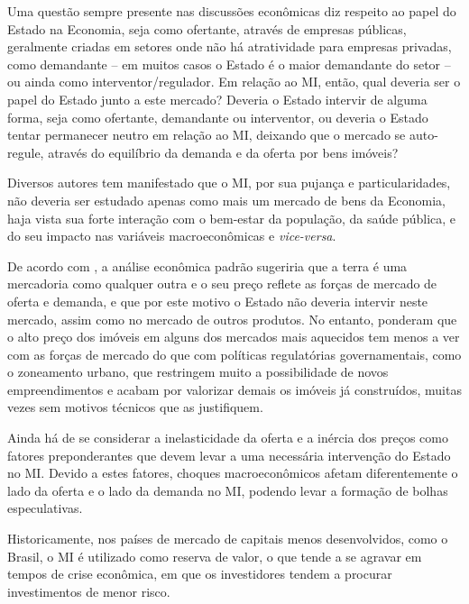 \documentclass[
	12pt,				%
	oneside,			%
	a4paper,			%
	chapter=TITLE,		%
	section=TITLE,		%
	english,			%
	brazil				%
	]{abntex2}
\begin{document}
Uma questão sempre presente nas discussões econômicas diz respeito ao papel do
Estado na Economia, seja como ofertante, através de empresas públicas,
geralmente criadas em setores onde não há atratividade para empresas privadas,
como demandante -- em muitos casos o Estado é o maior demandante do setor -- ou
ainda como interventor/regulador. Em relação ao \gls{MI}, então, qual deveria
ser o papel do Estado junto a este mercado? Deveria o Estado intervir de alguma
forma, seja como ofertante, demandante ou interventor, ou deveria o Estado
tentar permanecer neutro em relação ao \gls{MI}, deixando que o mercado se
auto-regule, através do equilíbrio da demanda e da oferta por bens imóveis?

Diversos autores tem manifestado que o \gls{MI}, por sua pujança e
particularidades, não deveria ser estudado apenas como mais um mercado de bens
da Economia, haja vista sua forte interação com o bem-estar da população, da
saúde pública, e do seu impacto nas variáveis macroeconômicas e \emph{vice-versa}.

De acordo com \textcite[p.~149-150]{Case2000}, a análise econômica padrão sugeriria que a
terra é uma mercadoria como qualquer outra e o seu preço reflete as forças de
mercado de oferta e demanda, e que por este motivo o Estado não deveria intervir
neste mercado, assim como no mercado de outros produtos. No entanto, \textcite{Case2000}
ponderam que o alto preço dos imóveis em alguns dos mercados mais aquecidos tem
menos a ver com as forças de mercado do que com políticas regulatórias
governamentais, como o zoneamento urbano, que restringem muito a possibilidade
de novos empreendimentos e acabam por valorizar demais os imóveis já
construídos, muitas vezes sem motivos técnicos que as justifiquem.

Ainda há de se considerar a inelasticidade da oferta e a inércia dos preços como
fatores preponderantes que devem levar a uma necessária intervenção do Estado no
\gls{MI}. Devido a estes fatores, choques macroeconômicos afetam diferentemente
o lado da oferta e o lado da demanda no \gls{MI}, podendo levar a formação de
bolhas especulativas.

Historicamente, nos países de mercado de capitais menos desenvolvidos, como o
Brasil, o \gls{MI} é utilizado como reserva de valor, o que tende a se agravar
em tempos de crise econômica, em que os investidores tendem a procurar
investimentos de menor risco.
\end{document}
